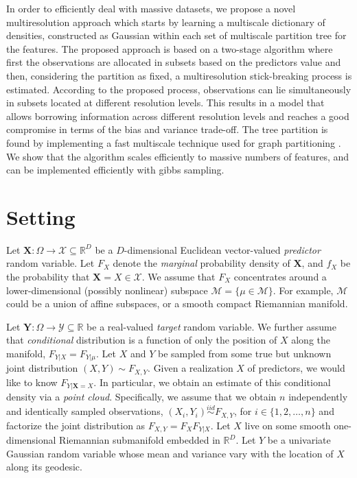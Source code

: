 \documentclass{article}
\newcommand{\iid}{\overset{iid}{\sim}}
\newcommand{\mbX}{\mathbf{X}}
\newcommand{\mbY}{\mathbf{Y}}
\newcommand{\Real}{\mathbb{R}}
\providecommand{\mc}[1]{\mathcal{#1}}
\newcommand{\from}{{\ensuremath{\colon}}}           %
\begin{document}
 In order to efficiently deal with massive datasets, we propose a novel multiresolution approach which starts by learning a multiscale dictionary of densities, constructed as Gaussian within each set of multiscale partition tree for the features. The proposed approach is based on a two-stage algorithm where first the observations are allocated in subsets based on the predictors value and then, considering the partition as fixed, a multiresolution stick-breaking process is estimated. According to the proposed process, observations can lie simultaneously in subsets located at different resolution levels. This results in a model that allows borrowing information across different resolution levels and reaches a good compromise in terms of the bias and variance trade-off. The tree partition is found by implementing a fast multiscale technique used for graph partitioning \cite{metis}.  We show that the algorithm scales efficiently to massive numbers of features, and can be implemented efficiently with gibbs sampling. 



\section{Setting} %
Let $\mbX \from \Omega \to \mathcal{X} \subseteq \Real^D$ be a $D$-dimensional Euclidean vector-valued \emph{predictor} random variable.  Let $F_X$ denote the \emph{marginal} probability density of $\mbX$, and $f_X$ be the probability that  $\mbX=X \in \mc{X}$.  We assume that $F_X$ concentrates around a lower-dimensional (possibly nonlinear) subspace $\mc{M}=\{\mu \in \mc{M}\}$.  For example, $\mc{M}$ could be a union of affine subspaces, or a smooth compact Riemannian manifold.  

Let $\mbY \from \Omega \to  \mathcal{Y} \subseteq \Real$ be a real-valued \emph{target} random variable. We further assume that \emph{conditional} distribution is a function of only the position of $X$ along the manifold, $F_{Y|X}=F_{Y|\mu}$. Let $X$ and $Y$ be sampled from some true but unknown joint distribution $(X,Y) \sim F_{X,Y}$.  Given a realization $X$ of predictors, we would like to know $F_{Y| \mbX=X}$.  In particular, we obtain an estimate of this conditional density via a \emph{point cloud}.  Specifically, we assume that we obtain $n$ independently and identically sampled observations, $(X_i,Y_i) \iid F_{X,Y}$, for $i \in \{1,2,\ldots,n\}$ and factorize the joint distribution  as $F_{X,Y}=F_X F_{Y|X}$.  Let $X$ live on some smooth one-dimensional Riemannian submanifold embedded in $\Real^D$.  Let $Y$ be a univariate Gaussian random variable whose mean and variance vary with the location of $X$ along its geodesic.  
\end{document}
